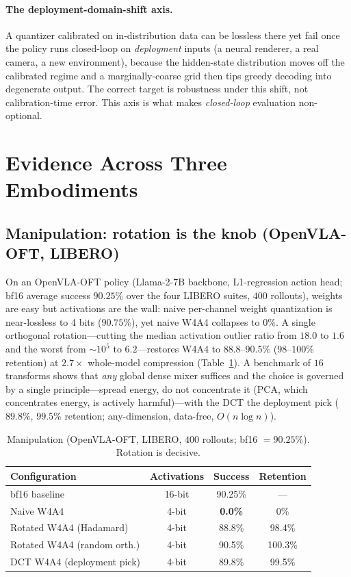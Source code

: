 \documentclass[11pt]{article}
\begin{document}
\paragraph{The deployment-domain-shift axis.} A quantizer calibrated on in-distribution data can be
lossless there yet fail once the policy runs closed-loop on \emph{deployment} inputs (a neural
renderer, a real camera, a new environment), because the hidden-state distribution moves off the
calibrated regime and a marginally-coarse grid then tips greedy decoding into degenerate output. The
correct target is robustness under this shift, not calibration-time error. This axis is what makes
\emph{closed-loop} evaluation non-optional.

\section{Evidence Across Three Embodiments}\label{sec:evidence}

\subsection{Manipulation: rotation is the knob (OpenVLA-OFT, LIBERO)}
On an OpenVLA-OFT policy (Llama-2-7B backbone, L1-regression action head; bf16 average success
$90.25\%$ over the four LIBERO suites, $400$ rollouts), weights are easy but activations are the
wall: naive per-channel weight quantization is near-lossless to 4 bits ($90.75\%$), yet naive W4A4
collapses to $0\%$. A single orthogonal rotation---cutting the median activation outlier ratio from
$18.0$ to $1.6$ and the worst from $\sim\!10^5$ to $6.2$---restores W4A4 to $88.8$--$90.5\%$
($98$--$100\%$ retention) at $2.7\times$ whole-model compression (Table~\ref{tab:manip}). A
benchmark of $16$ transforms shows that \emph{any} global dense mixer suffices and the choice is
governed by a single principle---spread energy, do not concentrate it (PCA, which concentrates
energy, is actively harmful)---with the DCT the deployment pick ($89.8\%$, $99.5\%$ retention;
any-dimension, data-free, $O(n\log n)$).

\begin{table}[h]\centering
\caption{Manipulation (OpenVLA-OFT, LIBERO, $400$ rollouts; bf16 $=90.25\%$). Rotation is decisive.}
\label{tab:manip}
\begin{tabular}{lccc}
\toprule
Configuration & Activations & Success & Retention \\
\midrule
bf16 baseline & 16-bit & 90.25\% & --- \\
Naive W4A4 & 4-bit & \textbf{0.0\%} & 0\% \\
Rotated W4A4 (Hadamard) & 4-bit & 88.8\% & 98.4\% \\
Rotated W4A4 (random orth.) & 4-bit & 90.5\% & 100.3\% \\
DCT W4A4 (deployment pick) & 4-bit & 89.8\% & 99.5\% \\
\bottomrule
\end{tabular}
\end{table}
\end{document}
